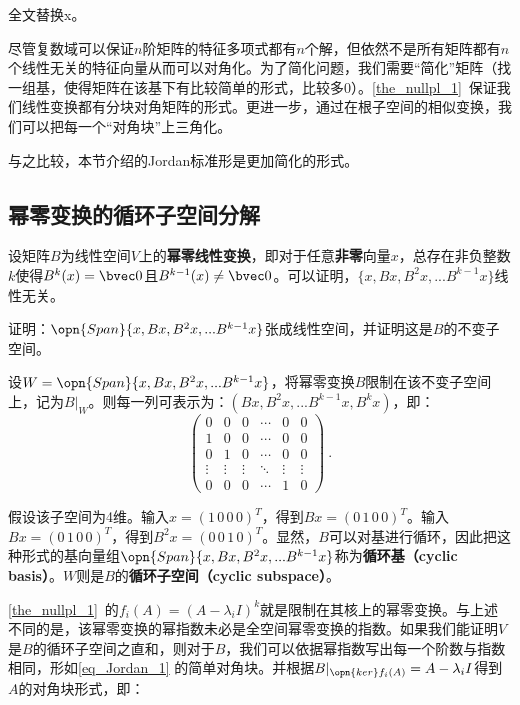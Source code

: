

\begin{issues}
\issueDraft 全文替换x。
\end{issues}

尽管复数域可以保证$n$阶矩阵的特征多项式都有$n$个解，但依然不是所有矩阵都有$n$个线性无关的特征向量从而可以对角化。为了简化问题，我们需要“简化”矩阵（找一组基，使得矩阵在该基下有比较简单的形式，比较多$0$）。\autoref{the_nullpl_1}~保证我们线性变换都有分块对角矩阵的形式。更进一步，通过在根子空间的相似变换，我们可以把每一个“对角块”上三角化。

与之比较，本节介绍的Jordan标准形是更加简化的形式。
\subsection{幂零变换的循环子空间分解}
设矩阵$B$为线性空间$V$上的\textbf{幂零线性变换}，即对于任意\textbf{非零}向量$x$，总存在非负整数$k$使得$B^{k}(x)=\bvec 0$且$B^{k-1}(x)\neq \bvec 0$。可以证明，$\{x,Bx,B^2x,...B^{k-1}x\}$线性无关。
\begin{exercise}{}
证明：$\opn{Span}\{x,Bx,B^2x,...B^{k-1}x\}$张成线性空间，并证明这是$B$的不变子空间。
\end{exercise}
设$W=\opn{Span}\{x,Bx,B^2x,...B^{k-1}x\}$，将幂零变换$B$限制在该不变子空间上，记为$B|_W$。则每一列可表示为：$(Bx,B^2x,...B^{k-1}x,B^kx)$，即：
\begin{equation}\label{eq_Jordan_1}
\left(\begin{array}{cccccc}
0 & 0 & 0 & \cdots & 0 & 0 \\
1 & 0 & 0 & \cdots & 0 & 0 \\
0 & 1 & 0 & \cdots & 0 & 0 \\
\vdots & \vdots & \vdots & \ddots & \vdots & \vdots \\
0 & 0 & 0 & \cdots & 1 & 0
\end{array}\right)~.
\end{equation}

假设该子空间为4维。输入$x=(1\,0\,0\,0)^T$，得到$Bx=(0\,1\,0\,0)^T$。输入$Bx=(0\,1\,0\,0)^T$，得到$B^2x=(0\,0\,1\,0)^T$。显然，$B$可以对基进行循环，因此把这种形式的基向量组$\opn{Span}\{x,Bx,B^2x,...B^{k-1}x\}$称为\textbf{循环基（cyclic basis）}。$W$则是$B$的\textbf{循环子空间（cyclic subspace）}。

\autoref{the_nullpl_1}~的$f_i(A)=(A-\lambda_i I )^k$就是限制在其核上的幂零变换。与上述不同的是，该幂零变换的幂指数未必是全空间幂零变换的指数。如果我们能证明$V$是$B$的循环子空间之直和，则对于$B$，我们可以依据幂指数写出每一个阶数与指数相同，形如\autoref{eq_Jordan_1} 的简单对角块。并根据$B|_{\opn{ker}f_i(A)}=A-\lambda_i I$得到$A$的对角块形式，即：


